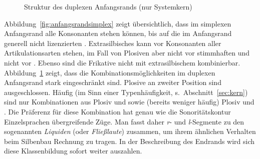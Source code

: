 \begin{figure}
  \centering
  \caption{Struktur des duplexen Anfangsrands (nur Systemkern)}
  \label{fig:anfangsrandduplex}
\end{figure}

Abbildung~\ref{fig:anfangsrandsimplex} zeigt übersichtlich, dass im simplexen Anfangsrand alle Konsonanten stehen können, bis auf die im Anfangsrand generell nicht lizenzierten \textipa{[s \c{c} X N]}.
Extrasilbisches \textipa{[S]} kann vor Konsonanten aller Artikulationsarten stehen, im Fall von Plosiven aber nicht vor stimmhaften und nicht vor \textipa{[k]}.
Ebenso sind die Frikative \textipa{[f S J h]} nicht mit extrasilbischem \textipa{[S]} kombinierbar.
Abbildung~\ref{fig:anfangsrandduplex} zeigt, dass die Kombinationsmöglichkeiten im duplexen Anfangsrand stark eingeschränkt sind.
Plosive an zweiter Position sind ausgeschlossen.
Häufig (im Sinn einer Typenhäufigkeit, s.\ Abschnitt~\ref{sec:kern}) sind nur Kombinationen aus Plosiv und \textipa{[K]} sowie (bereits weniger häufig) Plosiv und \textipa{[l]}.
Die Präferenz für diese Kombination hat genau wie die Sonoritätskontur Einzelsprachen übergreifende Züge.
Man fasst daher \textit{r}- und \textit{l}-Segmente zu den sogenannten \textit{Liquiden} (oder \textit{Fließlaute}) zusammen, um ihrem ähnlichen Verhalten beim Silbenbau Rechnung zu tragen.
In der Beschreibung des Endrands wird sich diese Klassenbildung sofort weiter auszahlen.

